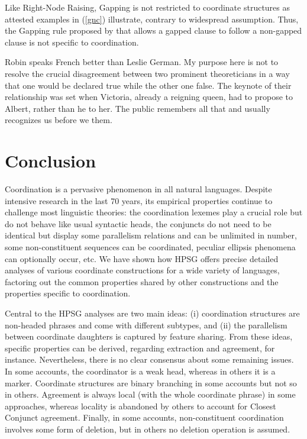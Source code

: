 {Like Right-Node Raising, Gapping is not restricted to coordinate structures as  attested 
examples in (\ref{gnc}) illustrate, contrary to widespread assumption.   Thus, the Gapping rule
proposed by \citet[]{sangheepark}  that allows a gapped clause to follow a non-gapped clause is not
specific to coordination.

\begin{exe}
\ex 
\begin{xlista}
\ex Robin speaks French better than Leslie \trace German.
\ex My purpose here is not to resolve the crucial disagreement between two prominent theoreticians in a way that one would be declared true while the other one \trace false.
\ex The keynote of their relationship was set when Victoria, already a reigning queen,
had to propose to Albert, rather than he \trace to her.
\ex The public remembers all that and usually recognizes us before we \trace them.
\end{xlista}\label{gnc}
\end{exe}




\section{Conclusion}

Coordination is a pervasive phenomenon in all natural languages. Despite intensive research in the last 70 years, its empirical properties continue to challenge most linguistic theories:  the coordination lexemes play a crucial role but do not behave like usual syntactic heads, the conjuncts do not need to be identical but display some parallelism relations and can be unlimited in number, some non-constituent sequences can be coordinated, peculiar ellipsis phenomena can optionally occur,  etc. We have shown how HPSG offers precise detailed analyses of various coordinate constructions for a wide variety of languages, factoring out the common properties shared by other constructions and the properties specific to coordination.

Central to the HPSG analyses are two main ideas: (i) coordination structures are non-headed phrases and come with different subtypes, and (ii) the parallelism between coordinate daughters is captured by feature sharing. From these ideas, specific properties can be derived, regarding extraction and agreement, for instance. Nevertheless, there is no clear consensus about some remaining issues. In some accounts, the coordinator is a weak head, whereas in others it is a marker. Coordinate structures are binary branching in some accounts but not so in others. Agreement is always local (with the whole coordinate phrase) in some approaches, whereas locality is abandoned by others to account for Closest Conjunct agreement. Finally, in some accounts, non-constituent coordination involves some form of deletion, but in others no deletion operation is assumed.

}%
 
